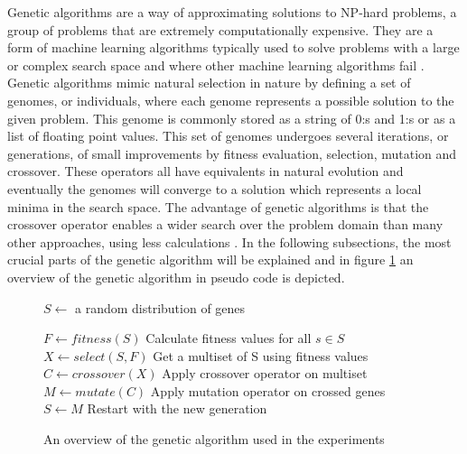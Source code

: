 \documentclass[a4paper,11pt]{kth-mag}
\begin{document}
Genetic algorithms are a way of approximating solutions to NP-hard problems, a group of problems that are extremely computationally expensive. They are a form of machine learning algorithms typically used to solve problems with a large or complex search space and where other machine learning algorithms fail \cite{marsland}. Genetic algorithms mimic natural selection in nature by defining a set of genomes, or individuals, where each genome represents a possible solution to the given problem. This genome is commonly stored as a string of 0:s and 1:s or as a list of floating point values. This set of genomes undergoes several iterations, or generations, of small improvements by fitness evaluation, selection, mutation and crossover. These operators all have equivalents in natural evolution and eventually the genomes will converge to a solution which represents a local minima in the search space. The advantage of genetic algorithms is that the crossover operator enables a wider search over the problem domain than many other approaches, using less calculations \cite{holland}. In the following subsections, the most crucial parts of the genetic algorithm will be explained and in figure \ref{algorithm-overview}   an overview of the genetic algorithm in pseudo code is depicted.

\begin{figure}
\begin{algorithmic}
\State $ S \gets $ a random distribution of genes

        \State $F\gets fitness(S)$
		\Comment Calculate fitness values for all $s \in S$
		\State $X \gets select(S,F)$
		\Comment Get a multiset of S using fitness values
		\State $C \gets crossover(X)$
		\Comment Apply crossover operator on multiset
		\State $M \gets mutate(C)$
		\Comment Apply mutation operator on crossed genes
		\State $S \gets M$
		\Comment Restart with the new generation
    \EndWhile
\end{algorithmic}
\caption{An overview of the genetic algorithm used in the experiments}
\label{algorithm-overview}
\end{figure}
\end{document}
